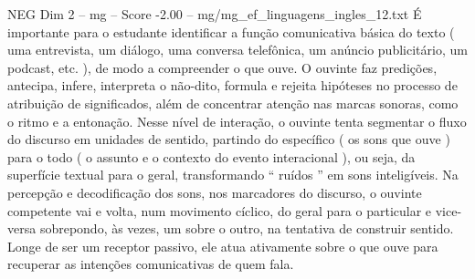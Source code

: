 \begin{textsample}{NEG Dim 2 – mg – Score -2.00 – mg/mg\_ef\_linguagens\_ingles\_12.txt}
É importante para o estudante identificar a função comunicativa básica do texto ( uma entrevista, um diálogo, uma conversa telefônica, um anúncio publicitário, um podcast, etc. ), de modo a compreender o que ouve.
O ouvinte faz predições, antecipa, infere, interpreta o não-dito, formula e rejeita hipóteses no processo de atribuição de significados, além de concentrar atenção nas marcas sonoras, como o ritmo e a entonação.
Nesse nível de interação, o ouvinte tenta segmentar o fluxo do discurso em unidades de sentido, partindo do específico ( os sons que ouve ) para o todo ( o assunto e o contexto do evento interacional ), ou seja, da superfície textual para o geral, transformando “ ruídos ” em sons inteligíveis.
Na percepção e decodificação dos sons, nos marcadores do discurso, o ouvinte competente vai e volta, num movimento cíclico, do geral para o particular e vice-versa sobrepondo, às vezes, um sobre o outro, na tentativa de construir sentido.
Longe de ser um receptor passivo, ele atua ativamente sobre o que ouve para recuperar as intenções comunicativas de quem fala.

\end{textsample}
